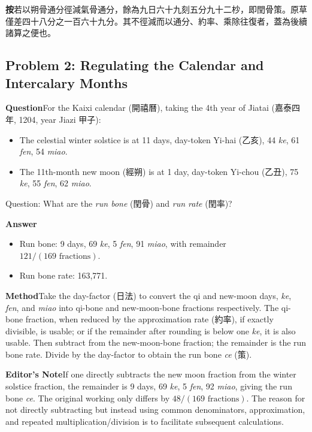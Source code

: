 \documentclass[11pt,a4paper]{article}
\newcommand{\AnCN}{\textbf{\color{headcolor}按}}
\newcommand{\WenEN}{\textbf{\color{headcolor}Question}}
\newcommand{\DaEN}{\textbf{\color{headcolor}Answer}}
\newcommand{\ShuEN}{\textbf{\color{headcolor}Method}}
\newcommand{\AnEN}{\textbf{\color{headcolor}Editor's Note}}
\begin{document}
\vspace{0.5em}
\AnCN{}\quad 若以朔骨通分徑減氣骨通分，餘為九日六十九刻五分九十二杪，即閏骨策。原草僅差四十八分之一百六十九分。其不徑減而以通分、約率、乘除往復者，蓋為後續諸算之便也。

\switchcolumn[1]
\subsection*{Problem 2: Regulating the Calendar and Intercalary Months}
\label{sec:zhilituimin}

\vspace{0.5em}
\WenEN{}\quad For the Kaixi calendar (開禧曆), taking the 4th year of Jiatai (嘉泰四年, 1204, year Jiazi 甲子):
\begin{itemize}[noitemsep,topsep=0pt]
  \item The celestial winter solstice is at 11 days, day-token Yi-hai (乙亥), 44 \textit{ke}, 61 \textit{fen}, 54 \textit{miao}.
  \item The 11th-month new moon (經朔) is at 1 day, day-token Yi-chou (乙丑), 75 \textit{ke}, 55 \textit{fen}, 62 \textit{miao}.
\end{itemize}
Question: What are the \textit{run bone} (閏骨) and \textit{run rate} (閏率)?

\vspace{0.5em}
\DaEN{}\quad
\begin{itemize}[noitemsep,topsep=0pt]
  \item Run bone: 9 days, 69 \textit{ke}, 5 \textit{fen}, 91 \textit{miao}, with remainder $121/(169\text{ fractions})$.
  \item Run bone rate: 163,771.
\end{itemize}

\vspace{0.5em}
\ShuEN{}\quad Take the day-factor (日法) to convert the qi and new-moon days, \textit{ke}, \textit{fen}, and \textit{miao} into qi-bone and new-moon-bone fractions respectively. The qi-bone fraction, when reduced by the approximation rate (約率), if exactly divisible, is usable; or if the remainder after rounding is below one \textit{ke}, it is also usable. Then subtract from the new-moon-bone fraction; the remainder is the run bone rate. Divide by the day-factor to obtain the run bone \textit{ce} (策).

\vspace{0.5em}
\AnEN{}\quad If one directly subtracts the new moon fraction from the winter solstice fraction, the remainder is 9 days, 69 \textit{ke}, 5 \textit{fen}, 92 \textit{miao}, giving the run bone \textit{ce}. The original working only differs by $48/(169\text{ fractions})$. The reason for not directly subtracting but instead using common denominators, approximation, and repeated multiplication/division is to facilitate subsequent calculations.
\end{document}
